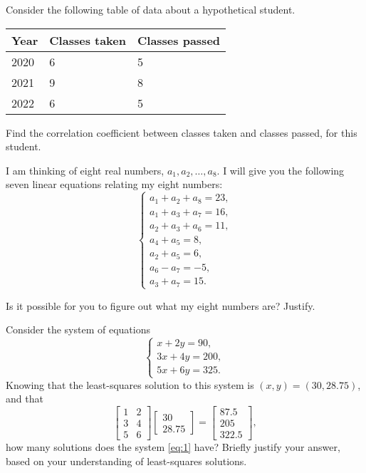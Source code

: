 \documentclass[addpoints]{exam}
\begin{document}
\begin{questions}

\question[25] Consider the following table of data about a hypothetical student.
\begin{center}
\begin{tabular}{|l|l|l|}
\hline
Year & Classes taken & Classes passed \\
\hline
2020 & 6 & 5 \\
2021 & 9 & 8 \\
2022 & 6 & 5 \\
\hline
\end{tabular}
\end{center}
Find the correlation coefficient between classes taken and classes passed, for this student.
 
\question[25] I am thinking of eight real numbers, $a_1, a_2, \dots, a_8$. I will give you the following seven linear equations relating my eight numbers:
\[
\begin{cases}
a_1 + a_2 + a_8 = 23,\\
a_1 + a_3 + a_7 = 16,\\
a_2 + a_3 + a_6 = 11,\\
a_4 + a_5 = 8,\\
a_2 + a_5 = 6,\\
a_6 - a_7 = -5,\\
a_3 + a_7 = 15.
\end{cases}
\]

Is it possible for you to figure out what my eight numbers are? Justify.

\question[25] Consider the system of equations
\begin{equation}\label{eq:1}
\begin{cases}
x + 2y = 90,\\
3x + 4y = 200,\\
5x + 6y = 325.
\end{cases}
\end{equation}
Knowing that the least-squares solution to this system is $(x,y)=(30,28.75)$, and that
\[\begin{bmatrix}
1 & 2 \\ 3 & 4 \\ 5 & 6
\end{bmatrix}
\begin{bmatrix}
30 \\ 28.75
\end{bmatrix}
=
\begin{bmatrix}
87.5 \\ 205 \\ 322.5
\end{bmatrix},
\]
how many solutions does the system \eqref{eq:1} have? Briefly justify your answer, based on your understanding of least-squares solutions.
\addquestionobject


\end{questions}
\end{document}
